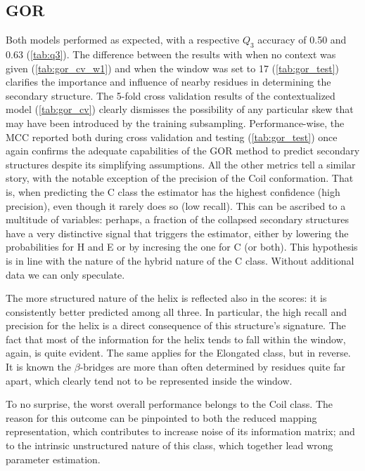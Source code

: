 \documentclass[nocrop]{bioinfo}
\begin{document}
\subsection*{GOR}
Both models performed as expected, with a respective $Q_3$ accuracy of 0.50 and 0.63 (\autoref{tab:q3}).
The difference between the results with when no context was given (\autoref{tab:gor_cv_w1}) and when the window was set to 17 (\autoref{tab:gor_test})  clarifies the importance and influence of nearby residues in determining the secondary structure.
The 5-fold cross validation results of the contextualized model (\autoref{tab:gor_cv}) clearly dismisses the possibility of any particular skew that may have been introduced by the training subsampling. 
Performance-wise, the MCC reported both during cross validation and testing (\autoref{tab:gor_test}) once again confirms the adequate capabilities of the GOR method to predict secondary structures despite its simplifying assumptions.
All the other metrics tell a similar story, with the notable exception of the precision of the Coil conformation.
That is, when predicting the C class the estimator has the highest confidence (high precision), even though it rarely does so (low recall).
This can be ascribed to a multitude of variables: perhaps, a fraction of the collapsed secondary structures have a very distinctive signal that triggers the estimator, either by lowering the probabilities for H and E or by incresing the one for C (or both).
This hypothesis is in line with the nature of the hybrid nature of the C class.
Without additional data we can only speculate.

The more structured nature of the helix is reflected also in the scores: it is consistently better predicted among all three.
In particular, the high recall and precision for the helix is a direct consequence of this structure's signature.
The fact that most of the information for the helix tends to fall within the window, again, is quite evident.
The same applies for the Elongated class, but in reverse.
It is known the $\beta$-bridges are more than often determined by residues quite far apart, which clearly tend not to be represented inside the window.

To no surprise, the worst overall performance belongs to the Coil class.
The reason for this outcome can be pinpointed to both the reduced mapping representation, which contributes to increase noise of its information matrix; and to the intrinsic unstructured nature of this class, which together lead wrong parameter estimation.
\end{document}
